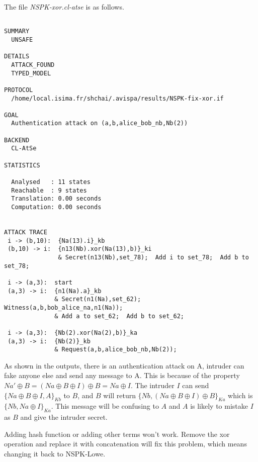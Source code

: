 \documentclass[a4paper, 12pt]{report}
\begin{document}
        The file \emph{NSPK-xor.cl-atse} is as follows.
        \begin{lstlisting}[frame=single]

SUMMARY
  UNSAFE

DETAILS
  ATTACK_FOUND
  TYPED_MODEL

PROTOCOL
  /home/local.isima.fr/shchai/.avispa/results/NSPK-fix-xor.if

GOAL
  Authentication attack on (a,b,alice_bob_nb,Nb(2))

BACKEND
  CL-AtSe

STATISTICS

  Analysed   : 11 states
  Reachable  : 9 states
  Translation: 0.00 seconds
  Computation: 0.00 seconds


ATTACK TRACE
 i -> (b,10):  {Na(13).i}_kb
 (b,10) -> i:  {n13(Nb).xor(Na(13),b)}_ki
               & Secret(n13(Nb),set_78);  Add i to set_78;  Add b to set_78;

 i -> (a,3):  start
 (a,3) -> i:  {n1(Na).a}_kb
              & Secret(n1(Na),set_62);  Witness(a,b,bob_alice_na,n1(Na));
              & Add a to set_62;  Add b to set_62;

 i -> (a,3):  {Nb(2).xor(Na(2),b)}_ka
 (a,3) -> i:  {Nb(2)}_kb
              & Request(a,b,alice_bob_nb,Nb(2));

        \end{lstlisting}
        As shown in the outputs, there is an authentication attack on A, intruder can fake anyone else and send any message to A. This is because of the property $Na'\oplus B=(Na\oplus B\oplus I)\oplus B=Na\oplus I$. The intruder $I$ can send $\{Na\oplus B\oplus I, A\}_{Kb}$ to $B$, and $B$ will return $\{Nb, (Na\oplus B\oplus I)\oplus B\}_{Ka}$ which is $\{Nb, Na\oplus I\}_{Ka}$. This message will be confusing to $A$ and $A$ is likely to mistake $I$ as $B$ and give the intruder
        secret.

        Adding hash function or adding other terms won't work. Remove the xor operation and replace it with concatenation will fix this problem, which means changing it back to NSPK-Lowe.
\end{document}
